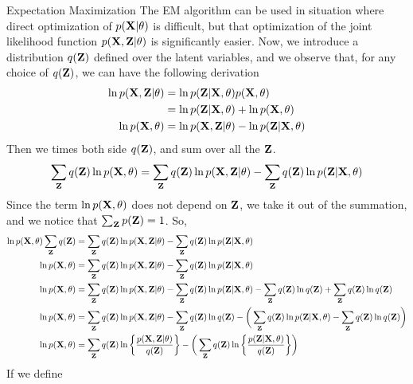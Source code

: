 \documentclass[9pt]{article}
\begin{document}
\begin{topic}{em}{Expectation Maximization}
The EM algorithm can be used in situation where direct optimization of $p(\mathbf{X}|\theta)$ is difficult, but that optimization of the joint likelihood function $p(\mathbf{X},\mathbf{Z}|\theta)$ is significantly easier. Now, we introduce a distribution $q(\mathbf{Z})$ defined over the latent variables, and we observe that, for any choice of $q(\mathbf{Z})$, we can have the following derivation
\[
\begin{split}
\ln p(\mathbf{X},\mathbf{Z}|\theta) &= \ln p(\mathbf{Z}|\mathbf{X},\theta)p(\mathbf{X},\theta)\\
&= \ln p(\mathbf{Z}|\mathbf{X},\theta) + \ln p(\mathbf{X},\theta)\\
\ln p(\mathbf{X},\theta) &= \ln p(\mathbf{X},\mathbf{Z}|\theta) -  \ln p(\mathbf{Z}|\mathbf{X},\theta)\\
\end{split}
\]
Then we times both side $q(\mathbf{Z})$, and sum over all the $\mathbf{Z}$.
\[
\sum_{\mathbf{Z}} q(\mathbf{Z}) \ln p(\mathbf{X},\theta) = \sum_{\mathbf{Z}} q(\mathbf{Z})\ln p(\mathbf{X},\mathbf{Z}|\theta) -  \sum_{\mathbf{Z}} q(\mathbf{Z})\ln p(\mathbf{Z}|\mathbf{X},\theta)
\]
Since the term $\ln p(\mathbf{X},\theta)$ does not depend on $\mathbf{Z}$, we take it out of the summation, and we notice that $\sum_{\mathbf{Z}}p(\mathbf{Z}) = 1$. So,
\[
\begin{split}
\ln p(\mathbf{X},\theta) \sum_{\mathbf{Z}} q(\mathbf{Z})  &= \sum_{\mathbf{Z}} q(\mathbf{Z})\ln p(\mathbf{X},\mathbf{Z}|\theta) -  \sum_{\mathbf{Z}} q(\mathbf{Z})\ln p(\mathbf{Z}|\mathbf{X},\theta)\\
\ln p(\mathbf{X},\theta) &= \sum_{\mathbf{Z}} q(\mathbf{Z})\ln p(\mathbf{X},\mathbf{Z}|\theta) -  \sum_{\mathbf{Z}} q(\mathbf{Z})\ln p(\mathbf{Z}|\mathbf{X},\theta)\\
\ln p(\mathbf{X},\theta) &= \sum_{\mathbf{Z}} q(\mathbf{Z})\ln p(\mathbf{X},\mathbf{Z}|\theta) -  \sum_{\mathbf{Z}} q(\mathbf{Z})\ln p(\mathbf{Z}|\mathbf{X},\theta) - \sum_{\mathbf{Z}} q(\mathbf{Z}) \ln q(\mathbf{Z}) + \sum_{\mathbf{Z}} q(\mathbf{Z}) \ln q(\mathbf{Z})\\
\ln p(\mathbf{X},\theta) &= \sum_{\mathbf{Z}} q(\mathbf{Z})\ln p(\mathbf{X},\mathbf{Z}|\theta) - \sum_{\mathbf{Z}} q(\mathbf{Z}) \ln q(\mathbf{Z}) - \bigg(\sum_{\mathbf{Z}} q(\mathbf{Z})\ln p(\mathbf{Z}|\mathbf{X},\theta) - \sum_{\mathbf{Z}} q(\mathbf{Z}) \ln q(\mathbf{Z})\bigg)\\
\ln p(\mathbf{X},\theta) &= \sum_{\mathbf{Z}} q(\mathbf{Z})\ln \bigg\{\frac{p(\mathbf{X},\mathbf{Z}|\theta)}{q(\mathbf{Z})}\bigg\}- \bigg(\sum_{\mathbf{Z}} q(\mathbf{Z})\ln \bigg\{\frac{p(\mathbf{Z}|\mathbf{X},\theta)}{q(\mathbf{Z})}\bigg\}\bigg)\\
\end{split}
\]
If we define
\[
\begin{split}

\end{split}\]
\end{topic}
\end{document}
